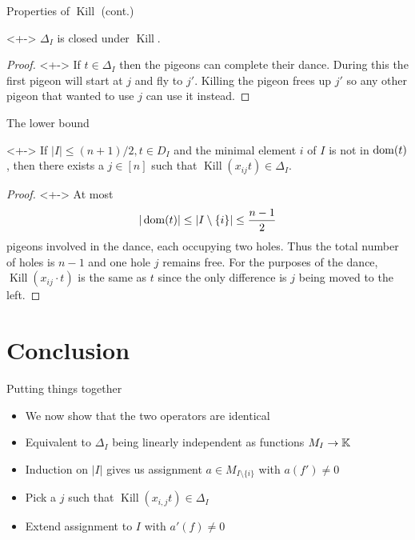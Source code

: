 \documentclass[xcolor={dvipsnames}, aspectratio=169, handout]{beamer}
\renewcommand{\K}{\operatorname{Kill}}
\begin{document}
\begin{frame}{Properties of $\K$ (cont.)}
     \begin{theorem}<+->
        $\Delta_I$ is closed under $\K$.
     \end{theorem}
    \begin{proof}[Proof\nopunct]<+->
        If $t \in \Delta_I$ then the pigeons can complete their dance. During this the first pigeon will start at $j$ and fly to $j'$. Killing the pigeon frees up $j'$ so any other pigeon that wanted to use $j$ can use it instead.
    \end{proof}
\end{frame}

\begin{frame}{The lower bound}
    \begin{theorem}<+->
        If $|I| \leq (n+1) / 2, t \in D_I$ and the minimal element $i$ of $I$ is not in $\operatorname{dom}(t)$, then there exists a $j \in [n]$ such that $\K(x_{ij} t) \in \Delta_I$.
    \end{theorem}
    \begin{proof}[Proof\nopunct{}]<+->
        At most $$
            |\operatorname{dom}(t)| \leq |I \setminus \{i\}| \leq \frac{n - 1}{2}
        $$ pigeons involved in the dance, each occupying two holes. Thus the total number of holes is $n - 1$ and one hole $j$ remains free. For the purposes of the dance, $\K(x_{ij} \cdot t)$ is the same as $t$ since the only difference is $j$ being moved to the left.
    \end{proof}
\end{frame}

\section{Conclusion}

\begin{frame}{Putting things together}
    \begin{itemize}[<+->]
        \item We now show that the two operators are identical
        \item Equivalent to $\Delta_I$ being linearly independent as functions $M_I \to \mathbb{K}$
        \item Induction on $|I|$ gives us assignment $a \in M_{I\setminus \{i\}}$ with $a(f') \neq 0$
        \item Pick a $j$ such that $\K(x_{i, j} t) \in \Delta_I$
        \item Extend assignment to $I$ with $a'(f) \neq 0$
    \end{itemize}
\end{frame}
\end{document}
